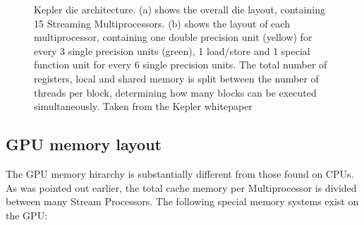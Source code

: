 \begin{figure}[ht!]
\begin{mdframed}
\begin{subfigure}[b]{0.6\textwidth}
    \caption{}
  \end{subfigure}
  \caption[Kepler architecture]{Kepler die architecture. (a) shows the overall die layout, containing 15 Streaming Multiprocessors. (b) shows the layout of each multiprocessor, containing one double precision unit (yellow) for every 
				3 single precision units (green), 1 load/store and 1 special function unit for every 6 single precision units. The total number of registers, local and shared memory is split between the number of threads per 
				block, determining how many blocks can be executed simultaneously. Taken from the Kepler whitepaper \cite{kepler}}
  \label{fig_kepler_arch}
 \end{mdframed}
\end{figure}

\subsection{GPU memory layout}
The GPU memory hirarchy is substantially different from those found on CPUs. As was pointed out earlier, the total cache memory
per Multiprocessor is divided between many Stream Processors. The following special memory systems exist on the GPU:
